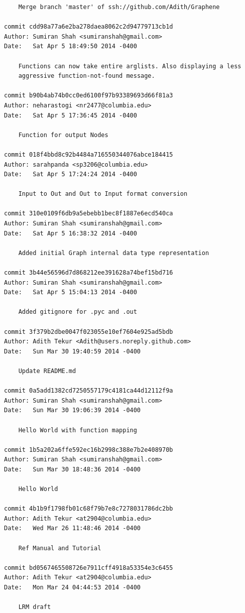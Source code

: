 \documentclass[a4paper]{article}
\begin{document}
\begin{verbatim}
    Merge branch 'master' of ssh://github.com/Adith/Graphene

commit cdd98a77a6e2ba278daea8062c2d94779713cb1d
Author: Sumiran Shah <sumiranshah@gmail.com>
Date:   Sat Apr 5 18:49:50 2014 -0400

    Functions can now take entire arglists. Also displaying a less 
    aggressive function-not-found message.

commit b90b4ab74b0cc0ed6100f97b93389693d66f81a3
Author: neharastogi <nr2477@columbia.edu>
Date:   Sat Apr 5 17:36:45 2014 -0400

    Function for output Nodes

commit 018f4bbd8c92b4484a716550344076abce184415
Author: sarahpanda <sp3206@columbia.edu>
Date:   Sat Apr 5 17:24:24 2014 -0400

    Input to Out and Out to Input format conversion

commit 310e0109f6db9a5ebebb1bec8f1887e6ecd540ca
Author: Sumiran Shah <sumiranshah@gmail.com>
Date:   Sat Apr 5 16:38:32 2014 -0400

    Added initial Graph internal data type representation

commit 3b44e56596d7d868212ee391628a74bef15bd716
Author: Sumiran Shah <sumiranshah@gmail.com>
Date:   Sat Apr 5 15:04:13 2014 -0400

    Added gitignore for .pyc and .out

commit 3f379b2dbe0047f023055e10ef7604e925ad5bdb
Author: Adith Tekur <Adith@users.noreply.github.com>
Date:   Sun Mar 30 19:40:59 2014 -0400

    Update README.md

commit 0a5add1382cd7250557179c4181ca44d12112f9a
Author: Sumiran Shah <sumiranshah@gmail.com>
Date:   Sun Mar 30 19:06:39 2014 -0400

    Hello World with function mapping

commit 1b5a202a6ffe592ec16b2998c388e7b2e408970b
Author: Sumiran Shah <sumiranshah@gmail.com>
Date:   Sun Mar 30 18:48:36 2014 -0400

    Hello World

commit 4b1b9f1798fb01c68f79b7e8c7278031786dc2bb
Author: Adith Tekur <at2904@columbia.edu>
Date:   Wed Mar 26 11:48:46 2014 -0400

    Ref Manual and Tutorial

commit bd0567465508726e7911cff4918a53354e3c6455
Author: Adith Tekur <at2904@columbia.edu>
Date:   Mon Mar 24 04:44:53 2014 -0400

    LRM draft


\end{verbatim}
\end{document}
